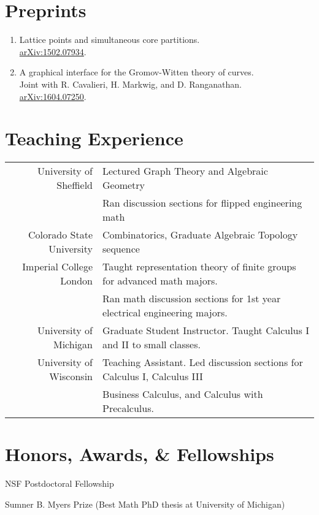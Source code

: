 \documentclass[11pt,letterpaper]{article}
\renewenvironment{itemize}{
  \begin{list}{}{
    \setlength{\leftmargin}{1.5em}
  }
}{
  \end{list}
}
\begin{document}
\section*{Preprints}
\begin{enumerate}

\item Lattice points and simultaneous core partitions. \\
\href{http://arxiv.org/abs/1502.07934}{arXiv:1502.07934}.

\item A graphical interface for the Gromov-Witten theory of curves. \\
 Joint with R. Cavalieri, H. Markwig, and D. Ranganathan. \\
\href{http://arxiv.org/abs/1604.07250}{arXiv:1604.07250}.

\end{enumerate}



\section*{Teaching Experience}
\begin{tabular}{rl}
University of Sheffield & Lectured Graph Theory and Algebraic Geometry \\
& Ran discussion sections for flipped engineering math \\
\rule{0pt}{3ex}Colorado State University & Combinatorics, Graduate Algebraic Topology sequence \\
\rule{0pt}{3ex}Imperial College London & Taught representation theory of finite groups for advanced math majors.  \\
& Ran math discussion sections for 1st year electrical engineering majors. \\
\rule{0pt}{3ex}University of Michigan & Graduate Student Instructor. Taught Calculus I and II to small classes. \\
\rule{0pt}{3ex}University of Wisconsin &  Teaching Assistant. Led discussion sections for Calculus I, Calculus III \\
&  Business Calculus, and Calculus with Precalculus. \\
\end{tabular}


\section*{Honors, Awards, \& Fellowships}

\begin{itemize}
\item NSF Postdoctoral Fellowship
\item Sumner B. Myers Prize (Best Math PhD thesis at University of Michigan)
\end{itemize}
\end{document}
